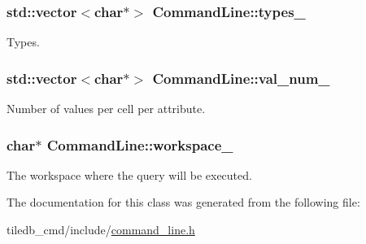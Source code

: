 \subsubsection[{types\+\_\+}]{\setlength{\rightskip}{0pt plus 5cm}std\+::vector$<$char$\ast$$>$ Command\+Line\+::types\+\_\+}\label{classCommandLine_a175f51137314bb9d0097e25130fed261}
Types. \hypertarget{classCommandLine_ae6b472ea68d54589244dab9b65ab86e1}{}
\subsubsection[{val\+\_\+num\+\_\+}]{\setlength{\rightskip}{0pt plus 5cm}std\+::vector$<$char$\ast$$>$ Command\+Line\+::val\+\_\+num\+\_\+}\label{classCommandLine_ae6b472ea68d54589244dab9b65ab86e1}
Number of values per cell per attribute. \hypertarget{classCommandLine_af9e82c06074c1bcb828b6d76e6285536}{}
\subsubsection[{workspace\+\_\+}]{\setlength{\rightskip}{0pt plus 5cm}char$\ast$ Command\+Line\+::workspace\+\_\+}\label{classCommandLine_af9e82c06074c1bcb828b6d76e6285536}
The workspace where the query will be executed. 

The documentation for this class was generated from the following file\+:\begin{DoxyCompactItemize}
\item 
tiledb\+\_\+cmd/include/\hyperlink{command__line_8h}{command\+\_\+line.\+h}\end{DoxyCompactItemize}
